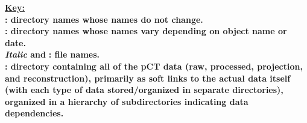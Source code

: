 \documentclass[landscape,12pt]{article}
\begin{document}
\baylorsection
\noindent\ul{\textbf{Key:}}\\
\vspace{0.3cm}
\color{Black}\textbf{ : directory names whose names do not change.}\\
\color{Black}\textbf{ : directory names whose names vary depending on object name or date.}\\
\color{Black}\textbf{\textit{Italic} and \color{blue}{Blue}\color{Black}}\textbf{ : file names. }\\
\baylorsection
\textbf{ \color{Black}: directory containing all of the pCT data (raw, processed, projection, and reconstruction), primarily as soft links to the actual data itself (with each type of data stored/organized in separate directories), organized in a hierarchy of subdirectories indicating data dependencies.}
\end{document}
